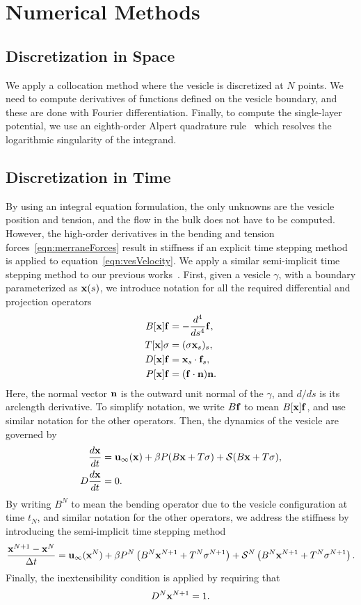 \documentclass[aps,prl,showpacs]{revtex4}
\begin{document}
\section{Numerical Methods}
\subsection{Discretization in Space}
We apply a collocation method where the vesicle is discretized at $N$
points. We need to compute derivatives of functions defined on the
vesicle boundary, and these are done with Fourier differentiation.
Finally, to compute the single-layer potential, we use an eighth-order
Alpert quadrature rule~\cite{alp1999} which resolves the logarithmic
singularity of the integrand.

\subsection{Discretization in Time}
By using an integral equation formulation, the only unknowns are the
vesicle position and tension, and the flow in the bulk does not have to
be computed. However, the high-order derivatives in the bending and
tension forces~\eqref{eqn:merraneForces} result in stiffness if an
explicit time stepping method is applied to
equation~\eqref{eqn:vesVelocity}. We apply a similar semi-implicit time
stepping method to our previous works~\cite{vee-gue-zor-bir2009,
qua-bir2014}. First, given a vesicle $\gamma$, with a boundary
parameterized as $\mathbf{x}(s)$, we introduce notation for all the required
differential and projection operators
\begin{align}
  B[\mathbf{x}]\mathbf{f} &= -\frac{d^4}{ds^4} \mathbf{f}, \\
  T[\mathbf{x}]\sigma &= (\sigma \mathbf{x}_s)_s, \\
  D[\mathbf{x}]\mathbf{f} &= \mathbf{x}_s \cdot \mathbf{f}_s, \\
  P[\mathbf{x}]\mathbf{f} &= (\mathbf{f} \cdot \mathbf{n}) \mathbf{n}. 
\end{align}
Here, the normal vector $\mathbf{n}$ is the outward unit normal of the
$\gamma$, and $d/ds$ is its arclength derivative. To simplify notation,
we write $B\mathbf{f}$ to mean $B[\mathbf{x}]\mathbf{f}$, and use similar notation for the
other operators. Then, the dynamics of the vesicle are governed by
\begin{align}
  \frac{d\mathbf{x}}{dt} &= \mathbf{u}_{\infty}(\mathbf{x}) + 
  \beta P(B\mathbf{x} + T\sigma) + \mathcal{S}(B\mathbf{x} + T\sigma), \\
  D \frac{d\mathbf{x}}{dt} &= 0.
\end{align}
By writing $B^N$ to mean the bending operator due to the vesicle
configuration at time $t_N$, and similar notation for the other
operators, we address the stiffness by introducing the semi-implicit
time stepping method
\begin{align}  
  \frac{\mathbf{x}^{N+1} - \mathbf{x}^N}{\Delta t} = \mathbf{u}_\infty(\mathbf{x}^N) 
  + \beta P^N\left(B^N\mathbf{x}^{N+1} + T^N\sigma^{N+1}\right) 
  + \mathcal{S}^N\left(B^N\mathbf{x}^{N+1} + T^N\sigma^{N+1}\right).
\end{align}
Finally, the inextensibility condition is applied by requiring that 
\begin{align}
  D^N\mathbf{x}^{N+1} = 1.
\end{align}
\end{document}
